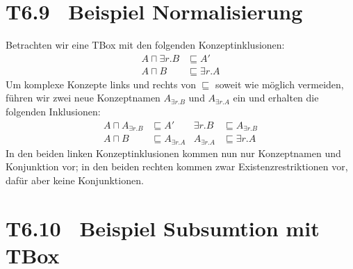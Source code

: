 \documentclass[fontsize=11pt, twoside=false, numbers=autoenddot]{scrbook}
\begin{document}
\pagebreak
\section*{T6.9~ Beispiel Normalisierung}

Betrachten wir eine TBox mit den folgenden Konzeptinklusionen: 
%
\begin{align*}
  A\sqcap \exists r.B & \sqsubseteq A' \\
  A\sqcap B & \sqsubseteq \exists r.A
\end{align*}
%
Um komplexe Konzepte links und rechts von $\sqsubseteq$ soweit
wie möglich vermeiden, führen wir zwei neue Konzeptnamen $A_{\exists
r.B}$ und $A_{\exists r.A}$ ein und erhalten die folgenden Inklusionen: 
%
\begin{align*}
  A\sqcap A_{\exists r.B} & \sqsubseteq A'  & \exists r.B &
  \sqsubseteq A_{\exists r.B} \\
  A\sqcap B & \sqsubseteq A_{\exists r.A} & A_{\exists r.A} &\sqsubseteq
  \exists r.A
\end{align*}
%
In den beiden linken Konzeptinklusionen kommen nun nur Konzeptnamen
und Konjunktion vor; in den beiden rechten kommen zwar
Existenzrestriktionen vor, dafür aber keine Konjunktionen.

\section*{T6.10~ Beispiel Subsumtion mit TBox}
\end{document}
